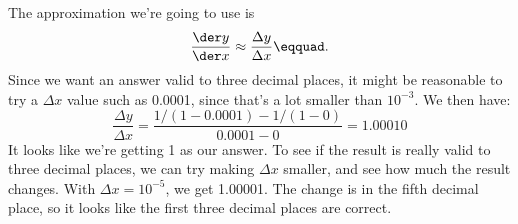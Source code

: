 The approximation we're going to use is
\begin{equation*}
  \frac{\der y}{\der x} \approx \frac{\Delta y}{\Delta x}\eqquad.
\end{equation*}
Since we want an answer valid to three decimal places, it might
be reasonable to try a $\Delta x$ value such as 0.0001, since that's
a lot smaller than $10^{-3}$. We then have:
\begin{equation*}
  \frac{\Delta y}{\Delta x} = \frac{1/(1-0.0001)-1/(1-0)}{0.0001-0} = 1.00010
\end{equation*}
It looks like we're getting 1 as our answer. To see if the result is really
valid to three decimal places, we can try making $\Delta x$ smaller, and see how
much the result changes. With $\Delta x=10^{-5}$, we get  1.00001. The change
is in the fifth decimal place, so it looks like the first three decimal places
are correct.
